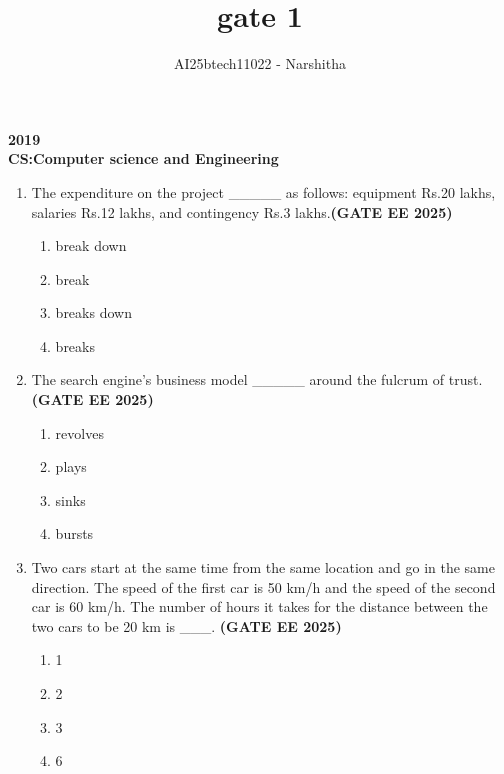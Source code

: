 \documentclass[journal,12pt,onecolumn]{IEEEtran}
\theoremstyle{remark}
\begin{document}
\title{gate 1}
\author{AI25btech11022 - Narshitha}
\maketitle
\renewcommand{\thefigure}{\theenumi}
\renewcommand{\thetable}{\theenumi}
\begin{center}
\large \textbf{2019}\\
\large \textbf{CS:Computer science and Engineering}\\
\end{center}

\begin{enumerate}
   



\item The expenditure on the project \_\_\_\_\_ as follows: equipment Rs.20 lakhs, salaries Rs.12 lakhs, and contingency Rs.3 lakhs.\hfill \textbf{(GATE EE 2025)}

\begin{enumerate}
\item  break down
\item  break
\item  breaks down
\item  breaks
\end{enumerate}

\item The search engine's business model \_\_\_\_\_ around the fulcrum of trust.\hfill \textbf{(GATE EE 2025)}

\begin{enumerate}
\item  revolves
\item  plays
\item  sinks
\item  bursts
\end{enumerate}

\item Two cars start at the same time from the same location and go in the same direction. 
The speed of the first car is 50 km/h and the speed of the second car is 60 km/h. 
The number of hours it takes for the distance between the two cars to be 20 km is \_\_\_.
\hfill \textbf{(GATE EE 2025)}
\begin{enumerate}
\item  1
\item  2
\item  3
\item  6
\end{enumerate}


\end{enumerate}
\end{document}
